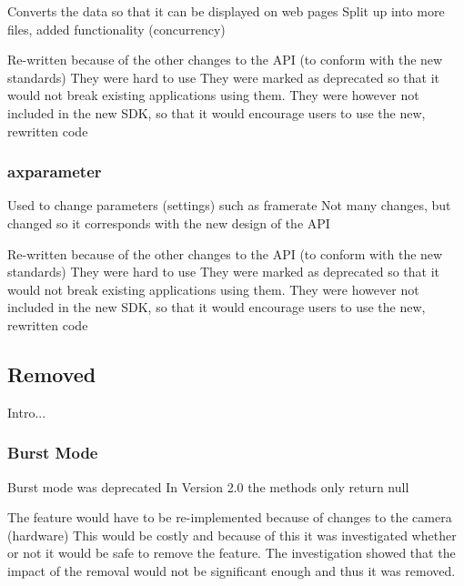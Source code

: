\documentclass[conference]{IEEEtran}
\begin{document}
Converts the data so that it can be displayed on web pages
Split up into more files, added functionality (concurrency)




Re-written because of the other changes to the API (to conform with the new standards)
They were hard to use
They were marked as deprecated so that it would not break existing applications using them. 
They were however not included in the new SDK, so that it would encourage users to use the new, rewritten code







\subsubsection{axparameter}

Used to change parameters (settings) such as framerate
Not many changes, but changed so it corresponds with the new design of the API




Re-written because of the other changes to the API (to conform with the new standards)
They were hard to use
They were marked as deprecated so that it would not break existing applications using them. 
They were however not included in the new SDK, so that it would encourage users to use the new, rewritten code






\subsection{Removed}
Intro...

\subsubsection{Burst Mode}

Burst mode was deprecated
In Version 2.0 the methods only return null




The feature would have to be re-implemented because of changes to the camera (hardware)
This would be costly and because of this it was investigated whether or not it would be safe to remove the feature. The investigation showed that the impact of the removal would not be significant enough and thus it was removed.
\end{document}
